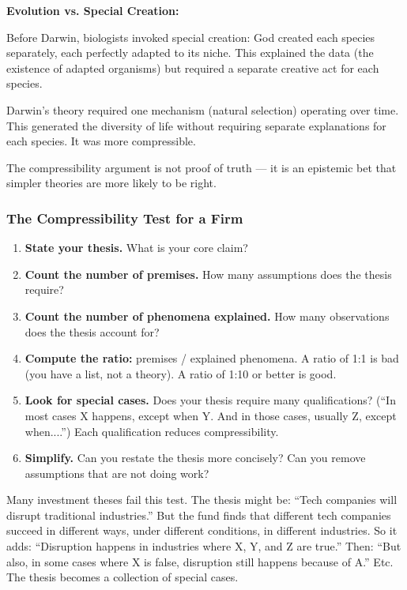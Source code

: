 \documentclass[11pt,letterpaper]{article}
\begin{document}
\textbf{Evolution vs. Special Creation:}

Before Darwin, biologists invoked special creation: God created each species separately, each perfectly adapted to its niche. This explained the data (the existence of adapted organisms) but required a separate creative act for each species.

Darwin's theory required one mechanism (natural selection) operating over time. This generated the diversity of life without requiring separate explanations for each species. It was more compressible.

The compressibility argument is not proof of truth — it is an epistemic bet that simpler theories are more likely to be right.

\subsubsection*{The Compressibility Test for a Firm}

\begin{enumerate}
  \item \textbf{State your thesis.} What is your core claim?
  \item \textbf{Count the number of premises.} How many assumptions does the thesis require?
  \item \textbf{Count the number of phenomena explained.} How many observations does the thesis account for?
  \item \textbf{Compute the ratio:} premises / explained phenomena. A ratio of 1:1 is bad (you have a list, not a theory). A ratio of 1:10 or better is good.
  \item \textbf{Look for special cases.} Does your thesis require many qualifications? (``In most cases X happens, except when Y. And in those cases, usually Z, except when....'') Each qualification reduces compressibility.
  \item \textbf{Simplify.} Can you restate the thesis more concisely? Can you remove assumptions that are not doing work?
\end{enumerate}

Many investment theses fail this test. The thesis might be: ``Tech companies will disrupt traditional industries.'' But the fund finds that different tech companies succeed in different ways, under different conditions, in different industries. So it adds: ``Disruption happens in industries where X, Y, and Z are true.'' Then: ``But also, in some cases where X is false, disruption still happens because of A.'' Etc. The thesis becomes a collection of special cases.
\end{document}
